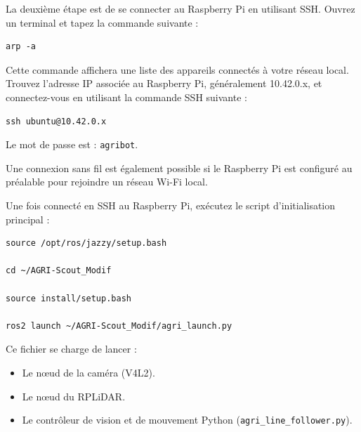 \documentclass [12pt, a4paper]{article}
\begin{document}
La deuxième étape est de se connecter au Raspberry Pi en utilisant SSH. Ouvrez un terminal et tapez la commande suivante :
\begin{verbatim}
arp -a
\end{verbatim}
Cette commande affichera une liste des appareils connectés à votre réseau local. 
Trouvez l'adresse IP associée au Raspberry Pi, généralement 10.42.0.x, et connectez-vous en utilisant la commande SSH suivante :
\begin{verbatim}
ssh ubuntu@10.42.0.x
\end{verbatim}
Le mot de passe est : \texttt{agribot}.

Une connexion sans fil est également possible si le Raspberry Pi est configuré au préalable pour rejoindre un réseau Wi-Fi local.


Une fois connecté en SSH au Raspberry Pi, exécutez le script d'initialisation principal :
\begin{verbatim}
source /opt/ros/jazzy/setup.bash

cd ~/AGRI-Scout_Modif

source install/setup.bash

ros2 launch ~/AGRI-Scout_Modif/agri_launch.py
\end{verbatim}

Ce fichier se charge de lancer :
\begin{itemize}
    \item Le nœud de la caméra (V4L2).
    \item Le nœud du RPLiDAR.
    \item Le contrôleur de vision et de mouvement Python (\texttt{agri\_line\_follower.py}).
\end{itemize}
\end{document}
